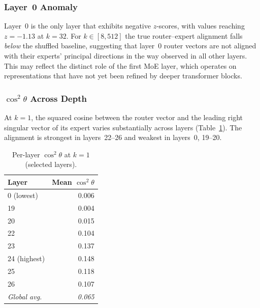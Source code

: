 \subsubsection{Layer~0 Anomaly}

Layer~0 is the only layer that exhibits negative $z$-scores, with values reaching $z = -1.13$ at $k = 32$. For $k \in [8, 512]$ the true router--expert alignment falls \emph{below} the shuffled baseline, suggesting that layer~0 router vectors are not aligned with their experts' principal directions in the way observed in all other layers. This may reflect the distinct role of the first MoE layer, which operates on representations that have not yet been refined by deeper transformer blocks.

\subsubsection{$\cos^2\theta$ Across Depth}

At $k = 1$, the squared cosine between the router vector and the leading right singular vector of its expert varies substantially across layers (Table~\ref{tab:cos_squared}). The alignment is strongest in layers~22--26 and weakest in layers~0, 19--20.

\begin{table}[h]
\centering
\caption{Per-layer $\cos^2\theta$ at $k=1$ (selected layers).}
\label{tab:cos_squared}
\small
\begin{tabular}{l r}
\toprule
Layer & Mean $\cos^2\theta$ \\
\midrule
0 (lowest)  & 0.006 \\
19          & 0.004 \\
20          & 0.015 \\
\midrule
22          & 0.104 \\
23          & 0.137 \\
24 (highest)& 0.148 \\
25          & 0.118 \\
26          & 0.107 \\
\midrule
\textit{Global avg.} & \textit{0.065} \\
\bottomrule
\end{tabular}
\end{table}
